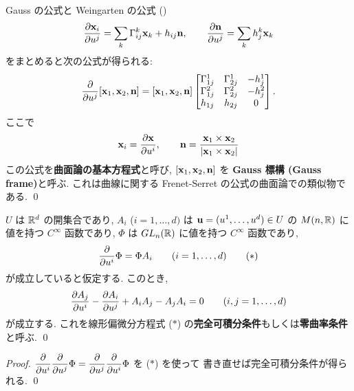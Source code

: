 \documentclass[12pt,twoside]{jarticle}
\begin{document}
\begin{theorem}[曲面論の基本方程式]
 Gauss の公式と Weingarten の公式 ()
 \begin{equation*}
  \dfrac{\partial{\mathbf x}_i}{\partial u^j} = \sum_k \Gamma^k_{ij}{\mathbf x}_k + h_{ij}{\mathbf n},
  \qquad
  \dfrac{\partial{\mathbf n}}{\partial u^j} = \sum_k h^k_j{\mathbf x}_k
 \end{equation*}
 をまとめると次の公式が得られる:
 \begin{equation*}
  \dfrac{\partial}{\partial u^j} [{\mathbf x}_1,{\mathbf x}_2,{\mathbf n}]
  =
  [{\mathbf x}_1,{\mathbf x}_2,{\mathbf n}]
  \begin{bmatrix}
   \Gamma^1_{1j} & \Gamma^1_{2j} & -h^1_j \\
   \Gamma^2_{1j} & \Gamma^2_{2j} & -h^2_j \\
   h_{1j}        & h_{2j}        & 0 \\
  \end{bmatrix}.
 \end{equation*} 
 ここで
 \begin{equation*}
  {\mathbf x}_i = \dfrac{\partial{\mathbf x}}{\partial u^i}, \qquad
  {\mathbf n} = \dfrac{{\mathbf x}_1\times{\mathbf x}_2}{|{\mathbf x}_1\times{\mathbf x}_2|}
 \end{equation*}
 この公式を{\bf 曲面論の基本方程式}と呼び, %
 $[{\mathbf x}_1,{\mathbf x}_2,{\mathbf n}]$ を {\bf Gauss 標構 (Gauss frame)}と呼ぶ.
 これは曲線に関する Frenet-Serret の公式の曲面論での類似物である.
 \qed
\end{theorem}

\begin{question}[完全可積分条件]
 \label{q:integrability}
 $U$ は ${\mathbb R}^d$ の開集合であり, 
 $A_i$ ($i=1,\dots,d)$ は ${\mathbf u}=(u^1,\dots,u^d)\in U$ 
 の $M(n,{\mathbb R})$ に値を持つ $C^\infty$ 函数であり, 
 $\Phi$ は $GL_n({\mathbb R})$ に値を持つ $C^\infty$ 函数であり, 
 \begin{equation*}
  \frac{\partial}{\partial u^i}\Phi = \Phi A_i \qquad (i = 1,\dots,d)
  \tag{$*$}
 \end{equation*}
  が成立していると仮定する. このとき,
  \begin{equation*}
    \frac{\partial A_j}{\partial u^i} - \frac{\partial A_i}{\partial u^j} + A_i A_j - A_j A_i = 0
    \qquad
    (i,j = 1,\dots,d)
  \end{equation*}
  が成立する. これを線形偏微分方程式 ($*$) 
  の{\bf 完全可積分条件}もしくは{\bf 零曲率条件}と呼ぶ.
  \qed
\end{question}

\begin{proof}
 $\dfrac{\partial}{\partial u^i}\dfrac{\partial}{\partial u^j}\Phi
 =\dfrac{\partial}{\partial u^j}\dfrac{\partial}{\partial u^i}\Phi$ を ($*$) を使って
 書き直せば完全可積分条件が得られる.
 \qed
\end{proof}
\end{document}
